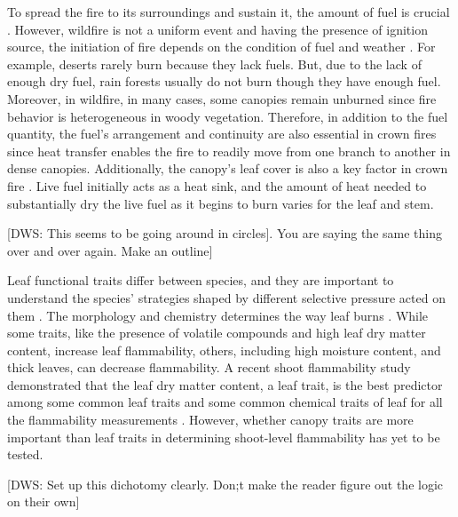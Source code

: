 \documentclass[12pt]{report}
\begin{document}
To spread the fire to its surroundings and sustain it, the amount of fuel is crucial \citep{rothermel1972mathematical}. However, wildfire is not a uniform event and having the presence of ignition source, the initiation of fire depends on the condition of fuel and weather \citep{bond1996fire}. For example, deserts rarely burn because they lack fuels. But, due to the lack of enough dry fuel, rain forests usually do not burn though they have enough fuel. Moreover, in wildfire, in many cases, some canopies remain unburned since fire behavior is heterogeneous in woody vegetation. Therefore, in addition to the fuel quantity, the fuel's arrangement and continuity are also essential in crown fires \citep{bond1996fire} since heat transfer enables the fire to readily move from one branch to another in dense canopies. Additionally, the canopy's leaf cover is  also a key factor in crown fire \citep{ray2005micrometeorological}. Live fuel initially acts as a heat sink, and the amount of heat needed to substantially dry the live fuel as it begins to burn varies for the leaf and stem.

[DWS: This seems to be going around in circles].  You are saying the same thing over and over again. Make an outline]

Leaf functional traits differ between species, and they are important to understand the species' strategies shaped by different selective pressure acted on them \citep{wright2004worldwide}. The morphology and chemistry determines the way leaf burns \citep{anderson1970forest, owens1998seasonal, schwilk2011scaling, pausas2016secondary, guerrero2021leaf, ganteaume2021volatile,alam2020shoot}. While some traits, like the presence of volatile compounds and high leaf dry matter content, increase leaf flammability, others, including high moisture content, and thick leaves, can decrease flammability. A recent shoot flammability study \citep{alam2020shoot} demonstrated that the leaf dry matter content, a leaf trait, is the best predictor among some common leaf traits and some common chemical traits of leaf for all the flammability measurements . However, whether canopy traits are more important than leaf traits in determining shoot-level flammability has yet to be tested.

[DWS: Set up this dichotomy clearly. Don;t make the reader figure out the logic on their own]
\end{document}
